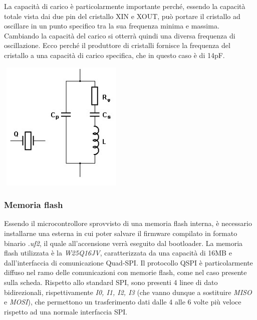 \noindent La capacità di carico è particolarmente importante perché, essendo la
capacità totale vista dai due pin del cristallo XIN e XOUT, può portare
il cristallo ad oscillare in un punto specifico tra la sua frequenza
minima e massima. Cambiando la capacità del carico si otterrà quindi una
diversa frequenza di oscillazione. Ecco perché il produttore di
cristalli fornisce la frequenza del cristallo a una capacità di carico
specifica, che in questo caso è di 14pF.

\begin{center}
\includegraphics[width=2.38542in,height=2.45833in]{figures/image28.png}
\captionsetup{type=figure}
\end{center}

\hypertarget{memoria-flash}{%
\subsubsection{\texorpdfstring{\hfill\break
Memoria flash}{ Memoria flash}}\label{memoria-flash}}

Essendo il microcontrollore sprovvisto di una memoria flash interna, 
è necessario installarne una esterna in cui poter salvare il firmware compilato in formato
binario \emph{.uf2}, il quale all'accensione verrà eseguito dal bootloader. La
memoria flash utilizzata è la \emph{W25Q16JV}, caratterizzata da una capacità di 16MB e dall’interfaccia di comunicazione Quad-SPI.
Il protocollo QSPI è particolarmente diffuso nel ramo delle comunicazioni con memorie flash,
come nel caso presente sulla scheda. Rispetto allo standard SPI, sono
presenti 4 linee di dato bidirezionali, rispettivamente \emph{I0, I1,
I2, I3} (che vanno dunque a sostituire \emph{MISO} e \emph{MOSI}), che
permettono un trasferimento dati dalle 4 alle 6 volte più veloce
rispetto ad una normale interfaccia SPI.

